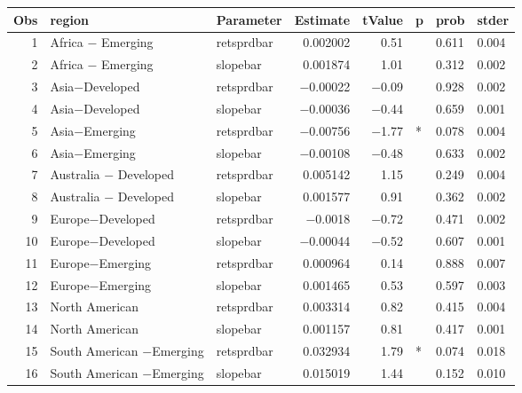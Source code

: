

\begin{longtable}{|r|l|l|r|r|l|l|l|}\hline
   Obs &    region &    Parameter &    Estimate &    tValue &    p &    prob &    stder\\\hline
\endhead
   1 &    Africa $-$ Emerging &    retsprdbar &    0.002002 &    0.51 &      &    0.611 &    0.004\\\hline
   2 &    Africa $-$ Emerging &    slopebar &    0.001874 &    1.01 &      &    0.312 &    0.002\\\hline
   3 &    Asia$-$Developed &    retsprdbar &    $-$0.00022 &    $-$0.09 &      &    0.928 &    0.002\\\hline
   4 &    Asia$-$Developed &    slopebar &    $-$0.00036 &    $-$0.44 &      &    0.659 &    0.001\\\hline
   5 &    Asia$-$Emerging &    retsprdbar &    $-$0.00756 &    $-$1.77 &    * &    0.078 &    0.004\\\hline
   6 &    Asia$-$Emerging &    slopebar &    $-$0.00108 &    $-$0.48 &      &    0.633 &    0.002\\\hline
   7 &    Australia $-$ Developed &    retsprdbar &    0.005142 &    1.15 &      &    0.249 &    0.004\\\hline
   8 &    Australia $-$ Developed &    slopebar &    0.001577 &    0.91 &      &    0.362 &    0.002\\\hline
   9 &    Europe$-$Developed &    retsprdbar &    $-$0.0018 &    $-$0.72 &      &    0.471 &    0.002\\\hline
   10 &    Europe$-$Developed &    slopebar &    $-$0.00044 &    $-$0.52 &      &    0.607 &    0.001\\\hline
   11 &    Europe$-$Emerging &    retsprdbar &    0.000964 &    0.14 &      &    0.888 &    0.007\\\hline
   12 &    Europe$-$Emerging &    slopebar &    0.001465 &    0.53 &      &    0.597 &    0.003\\\hline
   13 &    North American &    retsprdbar &    0.003314 &    0.82 &      &    0.415 &    0.004\\\hline
   14 &    North American &    slopebar &    0.001157 &    0.81 &      &    0.417 &    0.001\\\hline
   15 &    South American $-$Emerging &    retsprdbar &    0.032934 &    1.79 &    * &    0.074 &    0.018\\\hline
   16 &    South American $-$Emerging &    slopebar &    0.015019 &    1.44 &      &    0.152 &    0.010\\\hline
\end{longtable}

